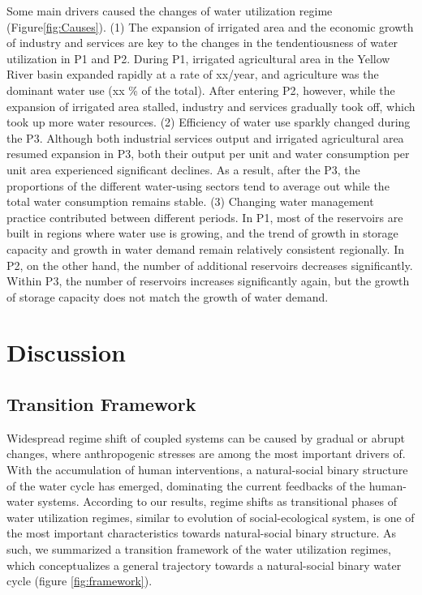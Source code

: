 \documentclass[9pt, twocolumn, twoside, lineno]{pnas-new}
\begin{document}
Some main drivers caused the changes of water utilization regime (Figure\ref{fig:Causes}).
(1) The expansion of irrigated area and the economic growth of industry and services are key to the
changes in the tendentiousness of water utilization in P1 and P2.
During P1, irrigated agricultural area in the Yellow River basin expanded rapidly at a rate of xx/year, 
and agriculture was the dominant water use (xx \% of the total).
After entering P2, however, while the expansion of irrigated area stalled, 
industry and services gradually took off, which took up more water resources.
(2) Efficiency of water use sparkly changed during the P3.
Although both industrial services output and irrigated agricultural area resumed expansion in P3, 
both their output per unit and water consumption per unit area experienced significant declines.
As a result, after the P3, the proportions of the different water-using sectors tend to average out 
while the total water consumption remains stable.
(3) Changing water management practice contributed between different periods.
In P1, most of the reservoirs are built in regions where water use is growing, 
and the trend of growth in storage capacity and growth in water demand remain relatively consistent regionally.
In P2, on the other hand, the number of additional reservoirs decreases significantly. 
Within P3, the number of reservoirs increases significantly again, 
but the growth of storage capacity does not match the growth of water demand.

\section*{Discussion}

\subsection*{Transition Framework}
Widespread regime shift of coupled systems can be caused by gradual or abrupt changes, 
where anthropogenic stresses are among the most important drivers of. 
With the accumulation of human interventions, 
a natural-social binary structure of the water cycle has emerged, 
dominating the current feedbacks of the human-water systems.
According to our results, 
regime shifts as transitional phases of water utilization regimes, 
similar to evolution of social-ecological system, 
is one of the most important characteristics towards natural-social binary structure.
As such, we summarized a transition framework of the water utilization regimes, 
which conceptualizes a general trajectory towards a natural-social binary water cycle (figure \ref{fig:framework}).
\end{document}
